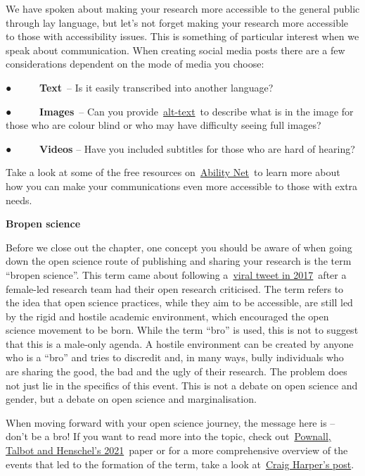 \documentclass[
]{book}
\begin{document}
We have spoken about making your research more accessible to the general public through lay language, but let's not forget making your research more accessible to those with accessibility issues. This is something of particular interest when we speak about communication. When creating social media posts there are a few considerations dependent on the mode of media you choose:

● ~ ~ ~ \textbf{Text}~-- Is it easily transcribed into another language?

● ~ ~ ~ \textbf{Images}~-- Can you provide~\href{https://abilitynet.org.uk/news-blogs/five-golden-rules-compliant-alt-text}{alt-text}~to describe what is in the image for those who are colour blind or who may have difficulty seeing full images?

● ~ ~ ~ \textbf{Videos} -- Have you included subtitles for those who are hard of hearing?

Take a look at some of the free resources on~\href{https://abilitynet.org.uk/free-resources/abilitynet-factsheets}{Ability Net}~to learn more about how you can make your communications even more accessible to those with extra needs.

\textbf{Bropen science}

Before we close out the chapter, one concept you should be aware of when going down the open science route of publishing and sharing your research is the term ``bropen science''. This term came about following a~\href{https://www.bps.org.uk/psychologist/bropenscience-broken-science}{viral tweet in 2017}~after a female-led research team had their open research criticised. The term refers to the idea that open science practices, while they aim to be accessible, are still led by the rigid and hostile academic environment, which encouraged the open science movement to be born. While the term ``bro'' is used, this is not to suggest that this is a male-only agenda. A hostile environment can be created by anyone who is a ``bro'' and tries to discredit and, in many ways, bully individuals who are sharing the good, the bad and the ugly of their research. The problem does not just lie in the specifics of this event. This is not a debate on open science and gender, but a debate on open science and marginalisation.

When moving forward with your open science journey, the message here is -- don't be a bro! If you want to read more into the topic, check out~\href{https://journals.sagepub.com/doi/full/10.1177/03616843211029255}{Pownall, Talbot and Henschel's 2021}~paper or for a more comprehensive overview of the events that led to the formation of the term, take a look at~\href{https://craigharper.substack.com/p/bropen-science?s=r}{Craig Harper's post}.
\end{document}
